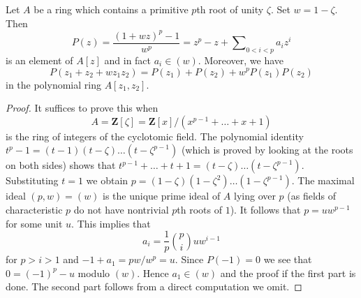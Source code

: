 \begin{lemma}
\label{lemma-prepare}
Let $A$ be a ring which contains a primitive $p$th root of unity $\zeta$.
Set $w = 1 - \zeta$. Then
$$
P(z) = \frac{(1 + wz)^p - 1}{w^p} =
z^p - z + \sum\nolimits_{0 < i < p} a_i z^i
$$
is an element of $A[z]$ and in fact $a_i \in (w)$. Moreover, we have
$$
P(z_1 + z_2 + w z_1 z_2) = P(z_1) + P(z_2) + w^p P(z_1) P(z_2)
$$
in the polynomial ring $A[z_1, z_2]$.
\end{lemma}

\begin{proof}
It suffices to prove this when
$$
A = \mathbf{Z}[\zeta] = \mathbf{Z}[x]/(x^{p - 1} + \ldots + x + 1)
$$
is the ring of integers of the cyclotomic field. The polynomial identity
$t^p - 1 = (t - 1)(t - \zeta) \ldots (t - \zeta^{p - 1})$
(which is proved by looking at the roots on both sides)
shows that
$t^{p - 1} + \ldots + t + 1 = (t - \zeta) \ldots (t - \zeta^{p - 1})$.
Substituting $t = 1$ we obtain
$p = (1 - \zeta)(1 - \zeta^2) \ldots (1 - \zeta^{p - 1})$.
The maximal ideal $(p, w) = (w)$ is the unique prime ideal of $A$
lying over $p$ (as fields of characteristic $p$ do not have nontrivial
$p$th roots of $1$). It follows that $p = u w^{p - 1}$ for some unit $u$.
This implies that
$$
a_i = \frac{1}{p} {p \choose i} u w^{i - 1}
$$
for $p > i > 1$ and $- 1 + a_1 = pw/w^p = u$. Since $P(-1) = 0$ we
see that $0 = (-1)^p - u$ modulo $(w)$. Hence $a_1 \in (w)$ and the
proof if the first part is done. The second part follows from a direct
computation we omit.
\end{proof}

